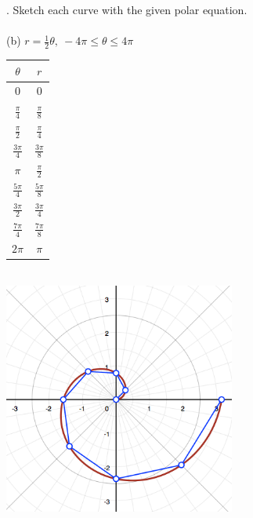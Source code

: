 \documentclass[11pt]{exam}
\begin{document}
. Sketch each curve with the given polar equation. \\
\\
\indent (b) $r=\frac{1}{2}\theta,\ -4\pi \leq \theta \leq 4\pi$\\
\newline
\newline
\def\arraystretch{1.5}
\begin{tabular}{ c|c }
  $\theta$ & $r$ \\
  \hline
  0                & 0                \\
  $\frac{\pi}{4}$  & $\frac{\pi}{8}$  \\
  $\frac{\pi}{2}$  & $\frac{\pi}{4}$  \\
  $\frac{3\pi}{4}$ & $\frac{3\pi}{8}$ \\
  $\pi$            & $\frac{\pi}{2}$  \\
  $\frac{5\pi}{4}$ & $\frac{5\pi}{8}$ \\
  $\frac{3\pi}{2}$ & $\frac{3\pi}{4}$ \\
  $\frac{7\pi}{4}$ & $\frac{7\pi}{8}$ \\
  $2\pi$           & $\pi$            \\
\end{tabular}\\
\includegraphics[width=3in]{g10b.png}
\end{document}
